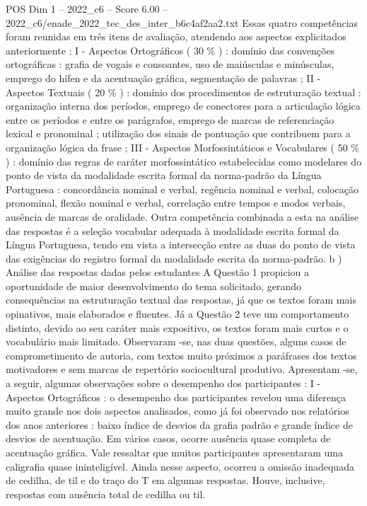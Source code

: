 \begin{textsample}{POS Dim 1 – 2022\_c6 – Score 6.00 – 2022\_c6/enade\_2022\_tec\_des\_inter\_b6c4af2aa2.txt}
Essas quatro competências foram reunidas em três itens de avaliação, atendendo aos aspectos explicitados anteriormente : I - Aspectos Ortográficos ( 30 \% ) : domínio das convenções ortográficas : grafia de vogais e consoantes, uso de maiúsculas e minúsculas, emprego do hífen e da acentuação gráfica, segmentação de palavras ; II - Aspectos Textuais ( 20 \% ) : domínio dos procedimentos de estruturação textual : organização interna dos períodos, emprego de conectores para a articulação lógica entre os períodos e entre os parágrafos, emprego de marcas de referenciação lexical e pronominal ; utilização dos sinais de pontuação que contribuem para a organização lógica da frase ; III - Aspectos Morfossintáticos e Vocabulares ( 50 \% ) : domínio das regras de caráter morfossintático estabelecidas como modelares do ponto de vista da modalidade escrita formal da norma-padrão da Língua Portuguesa : concordância nominal e verbal, regência nominal e verbal, colocação pronominal, flexão nominal e verbal, correlação entre tempos e modos verbais, ausência de marcas de oralidade.
Outra competência combinada a esta na análise das respostas é a seleção vocabular adequada à modalidade escrita formal da Língua Portuguesa, tendo em vista a intersecção entre as duas do ponto de vista das exigências do registro formal da modalidade escrita da norma-padrão. b ) Análise das respostas dadas pelos estudantes A Questão 1 propiciou a oportunidade de maior desenvolvimento do tema solicitado, gerando consequências na estruturação textual das respostas, já que os textos foram mais opinativos, mais elaborados e fluentes.
Já a Questão 2 teve um comportamento distinto, devido ao seu caráter mais expositivo, os textos foram mais curtos e o vocabulário mais limitado.
Observaram -se, nas duas questões, alguns casos de comprometimento de autoria, com textos muito próximos a paráfrases dos textos motivadores e sem marcas de repertório sociocultural produtivo.
Apresentam -se, a seguir, algumas observações sobre o desempenho dos participantes : I - Aspectos Ortográficos : o desempenho dos participantes revelou uma diferença muito grande nos dois aspectos analisados, como já foi observado nos relatórios dos anos anteriores : baixo índice de desvios da grafia padrão e grande índice de desvios de acentuação.
Em vários casos, ocorre ausência quase completa de acentuação gráfica.
Vale ressaltar que muitos participantes apresentaram uma caligrafia quase ininteligível.
Ainda nesse aspecto, ocorreu a omissão inadequada de cedilha, de til e do traço do T em algumas respostas.
Houve, inclusive, respostas com ausência total de cedilha ou til.

\end{textsample}
